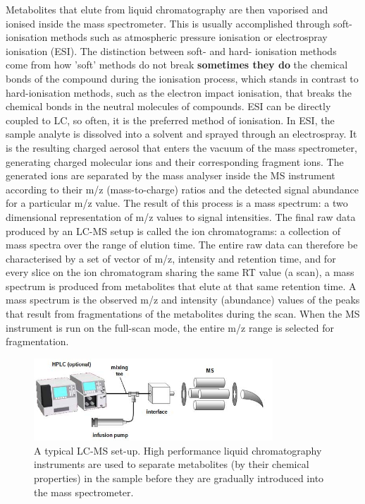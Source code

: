 Metabolites that elute from liquid chromatography are then vaporised and ionised inside the mass spectrometer. This is usually accomplished through soft-ionisation methods such as atmospheric pressure ionisation or electrospray ionisation (ESI). The distinction between soft- and hard- ionisation methods come from how 'soft' methods do not break \textbf{sometimes they do} the chemical bonds of the compound during the ionisation process, which stands in contrast to hard-ionisation methods, such as the electron impact ionisation, that breaks the chemical bonds in the neutral molecules of compounds. ESI can be directly coupled to LC, so often, it is the preferred method of ionisation. In ESI, the sample analyte is dissolved into a solvent and sprayed through an electrospray. It is the resulting charged aerosol that enters the vacuum of the mass spectrometer, generating charged molecular ions and their corresponding fragment ions. The generated ions are separated by the mass analyser inside the MS instrument according to their m/z (mass-to-charge) ratios and the detected signal abundance for a particular m/z value. The result of this process is a mass spectrum: a two dimensional representation of m/z values to signal intensities. The final raw data produced by an LC-MS setup is called the ion chromatograms: a collection of mass spectra over the range of elution time. The entire raw data can therefore be characterised by a set of vector of m/z, intensity and retention time, and for every slice on the ion chromatogram sharing the same RT value (a scan), a mass spectrum is produced from metabolites that elute at that same retention time. A mass spectrum is the observed m/z and intensity (abundance) values of the peaks that result from fragmentations of the metabolites during the scan. When the MS instrument is run on the full-scan mode, the entire m/z range is selected for fragmentation. 

\begin{figure}[htb!]
\noindent \begin{centering}
\includegraphics[width=0.8\textwidth]{02-background/figures/Fig-1}
\par\end{centering}
\caption{\label{fig:LC-MS-setup}A typical LC-MS set-up. High performance liquid chromatography instruments are used to separate metabolites (by their chemical properties) in the sample before they are gradually introduced into the mass spectrometer.}
\end{figure}

